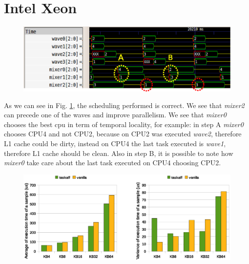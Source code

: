\section{Intel Xeon}

\begin{figure}[htbp]
\centering
\includegraphics[width=\widefigure]{images/results_xeon/final_xeon.eps}
\caption{}
\label{fig:trace_xeon}
\end{figure}

As we can see in Fig. \ref{fig:trace_xeon}, the scheduling performed is correct. We see that \textit{mixer2} can precede one of the waves and improve 
parallelism. We see that \textit{mixer0} chooses the best cpu in term of temporal locality, for example: in step A \textit{mixer0} chooses CPU4 and not 
CPU2, because on CPU2 was executed \textit{wave2}, therefore L1 cache could be dirty, instead on CPU4 the last task executed is \textit{wave1}, therefore 
L1 cache should be clean. Also in step B, it is possible to note how \textit{mixer0} take care about the last task executed on CPU4 choosing CPU2.

\begin{figure}[htbp]
\centering
\includegraphics[width=\widefigure]{images/results_xeon/time_avg_var.eps}
\caption{}
\label{fig:time_avg_var_xeon}
\end{figure}


